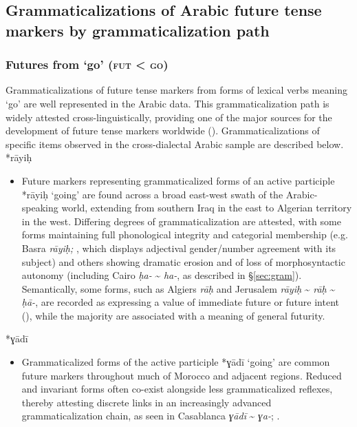 \documentclass[output=paper]{langsci/langscibook}
\begin{document}
\subsection{Grammaticalizations of Arabic future tense markers by grammaticalization path}\label{sec:fut}
\subsubsection{ Futures from ‘go’ (\textsc{fut} < \textsc{go})}

Grammaticalizations of future tense markers from forms of lexical verbs meaning ‘go’ are well represented in the Arabic data. This grammaticalization path is widely attested cross-linguistically, providing one of the major sources for the development of future tense markers worldwide (\citealt{Bybee1994,HeineKuteva2002}). Grammaticalizations of specific items observed in the cross-dialectal Arabic sample are described below.\\
 
*rāyiḥ

\begin{itemize}

  \item[]
Future markers representing grammaticalized forms of an active participle *rāyiḥ ‘going’ are found across a broad east-west swath of the Arabic-speaking world, extending from southern Iraq in the east to Algerian territory in the west. Differing degrees of grammaticalization are attested, with some forms maintaining full phonological integrity and categorial membership (e.g. Basra \textit{rāyiḥ;} \citealt{Mahdi1985}, which displays adjectival gender/number agreement with its subject) and others showing dramatic erosion and of loss of morphosyntactic autonomy (including Cairo \textit{ḥa-} {\textasciitilde} \textit{ha-}, as described in §\ref{sec:gram}). Semantically, some forms, such as Algiers \textit{rāḥ} and Jerusalem \textit{rāyiḥ} {\textasciitilde} \textit{rāḥ} {\textasciitilde} \textit{ḥā-}, are recorded as expressing a value of immediate future or future intent (\citealt{Boucherit2011,Rosenhouse2011}), while the majority are associated with a meaning of general futurity.
\end{itemize}
 
*ɣādī

\begin{itemize}

  \item[]
Grammaticalized forms of the active participle *ɣādī ‘going’ are common future markers throughout much of Morocco and adjacent regions. Reduced and invariant forms often co-exist alongside less grammaticalized reflexes, thereby attesting discrete links in an increasingly advanced grammaticalization chain, as seen in Casablanca \textit{ɣādī} {\textasciitilde} \textit{ɣa-}; \citealt{Caubet2011}.
\end{itemize}
 
\end{document}
